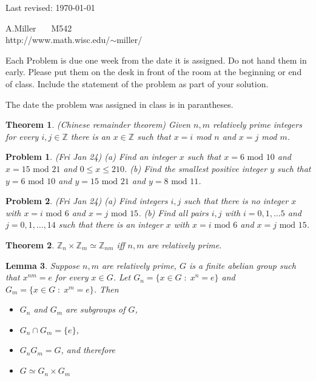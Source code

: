 \documentclass[12pt]{article}
\def\zz{{\mathbb Z}}
\def\isom{\simeq}
\def\st{\;:\;}
\newtheorem{theorem}{Theorem}
\newtheorem{lemma}[theorem]{Lemma}
\newtheorem{prob}{Problem}
\begin{document}
\noindent  Last revised: \today

\begin{flushright}
  A.Miller $\;\;\;\;$  M542 \\
  http://www.math.wisc.edu/$\sim$miller/\\
\end{flushright}


\bigskip
Each Problem is due one week from the date it is assigned.
Do not hand them in early.
Please put them on the desk in front of the room at the
beginning or end of class. Include the statement of the problem
as part of your solution.

The date the problem was assigned in class is in parantheses.

\bigskip

\begin{theorem}
(Chinese remainder theorem) Given $n,m$ relatively prime integers for
every $i,j\in\zz$ there is an $x\in\zz$ such that
$x=i$ mod  $n$ and $x=j$ mod  $m$.
\end{theorem}

\def\mod{\mbox{ mod }}

\begin{prob} (Fri Jan 24) (a) Find an integer $x$ such that
$x= 6 \mod 10$ and $x=15 \mod 21$ and $0\leq x\leq 210$.
(b) Find the smallest positive integer $y$ such that 
$y= 6 \mod 10$ and $y=15 \mod 21$ and $y= 8 \mod 11$.
\end{prob}

\begin{prob}(Fri Jan 24)
(a) Find integers $i,j$ such that there is no integer $x$ with
$x= i \mod 6$ and $x= j \mod 15$.   (b) Find all pairs $i,j$
with $i=0,1,\dots 5$ and $j=0,1,\ldots, 14$ such that there
is an integer $x$ with $x= i \mod 6$ and $x= j \mod 15$.
\end{prob}


\begin{theorem}
$\zz_n\times\zz_m\isom \zz_{nm}$ iff $n,m$ are relatively prime.
\end{theorem}

\begin{lemma}
Suppose $n,m$ are relatively prime, $G$ is a finite abelian group such that
$x^{nm}=e$ for every $x\in G$.  Let $G_n=\{x\in G\st x^n=e\}$ and
$G_m=\{x\in G\st x^m=e\}$.  Then
\begin{itemize}
\item $G_n$ and $G_m$ are subgroups of $G$,
\item $G_n\cap G_m=\{e\}$,
\item $G_nG_m=G$, and therefore
\item $G\isom G_n\times G_m$
\end{itemize}
\end{lemma}
\end{document}
